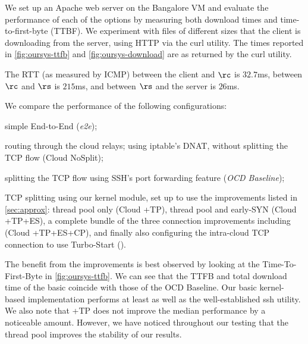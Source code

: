 We set up an Apache web server on the Bangalore VM and evaluate the performance of each of the options by measuring both download times and time-to-first-byte (TTBF). We experiment with files of different sizes that the client is downloading from the server, using HTTP via the curl utility. The times reported in \autoref{fig:oursys-ttfb} and \autoref{fig:oursys-download}  are as returned by the curl utility. 

The RTT  (as measured by ICMP) between the client and $\rc$ is $32.7$ms, between $\rc$ and $\rs$ is $215$ms, and between $\rs$ and the server is $26$ms.

We compare the performance of the following configurations: \begin{romanlist}
     \item simple End-to-End (\textit{e2e});
     \item routing through the cloud relays; using iptable's DNAT, without splitting the TCP flow (Cloud NoSplit);
     \item splitting the TCP flow using SSH's port forwarding feature (\textit{OCD Baseline});
     \item TCP splitting using our \oursys kernel module, set up to use the improvements listed in \autoref{sec:approx}: thread pool only (Cloud \oursys+TP), thread pool and early-SYN (Cloud \oursys+TP+ES), a complete bundle of the three connection improvements including \reconn (Cloud \oursys+TP+ES+CP), and finally also configuring the intra-cloud TCP connection to use Turbo-Start (\textit{\oursys}).
\end{romanlist}

The benefit from the improvements is best observed by looking at the Time-To-First-Byte in \autoref{fig:oursys-ttfb}. We can see that the  TTFB and total download time of the basic \oursys coincide with those of the OCD Baseline. Our basic kernel-based implementation performs at least as well as the well-established ssh utility. We also note that \oursys+TP does not improve the median performance by a noticeable amount. However, we have noticed throughout our testing that the thread pool improves the stability of our results.

